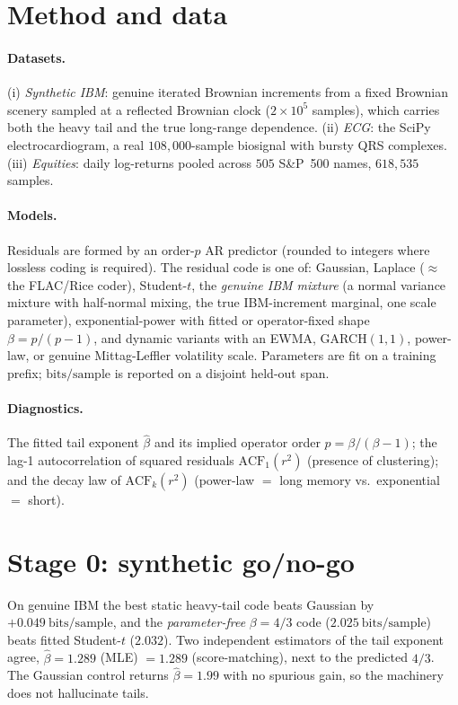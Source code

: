 \documentclass[11pt,reqno]{amsart}
\theoremstyle{plain}
\theoremstyle{definition}
\theoremstyle{remark}
\newcommand{\bps}{\mathrm{bits/sample}}
\begin{document}
\section{Method and data}
\label{sec:method}

\paragraph{Datasets.} (i) \emph{Synthetic IBM}: genuine iterated Brownian
increments from a fixed Brownian scenery sampled at a reflected Brownian clock
($2\times10^5$ samples), which carries both the heavy tail and the true
long-range dependence. (ii) \emph{ECG}: the SciPy electrocardiogram, a real
$108{,}000$-sample biosignal with bursty QRS complexes. (iii) \emph{Equities}:
daily log-returns pooled across $505$ S\&P~500 names, $618{,}535$ samples.

\paragraph{Models.} Residuals are formed by an order-$p$ AR predictor (rounded
to integers where lossless coding is required). The residual code is one of:
Gaussian, Laplace ($\approx$ the FLAC/Rice coder), Student-$t$, the
\emph{genuine IBM mixture} (a normal variance mixture with half-normal mixing,
the true IBM-increment marginal, one scale parameter), exponential-power with
fitted or operator-fixed shape $\beta=p/(p-1)$, and dynamic variants with an
EWMA, GARCH$(1,1)$, power-law, or genuine Mittag-Leffler volatility scale. Parameters are fit on a training
prefix; $\bps$ is reported on a disjoint held-out span.

\paragraph{Diagnostics.} The fitted tail exponent $\hat\beta$ and its implied
operator order $p=\beta/(\beta-1)$; the lag-1 autocorrelation of squared
residuals $\mathrm{ACF}_1(r^2)$ (presence of clustering); and the decay law of
$\mathrm{ACF}_k(r^2)$ (power-law $=$ long memory vs.\ exponential $=$ short).

\section{Stage 0: synthetic go/no-go}
\label{sec:stage0}

On genuine IBM the best static heavy-tail code beats Gaussian by
$+0.049~\bps$, and the \emph{parameter-free} $\beta=4/3$ code ($2.025~\bps$)
beats fitted Student-$t$ ($2.032$). Two independent estimators of the tail
exponent agree, $\hat\beta=1.289$ (MLE) $=1.289$ (score-matching), next to the
predicted $4/3$. The Gaussian control returns $\hat\beta=1.99$ with no spurious
gain, so the machinery does not hallucinate tails.
\end{document}
